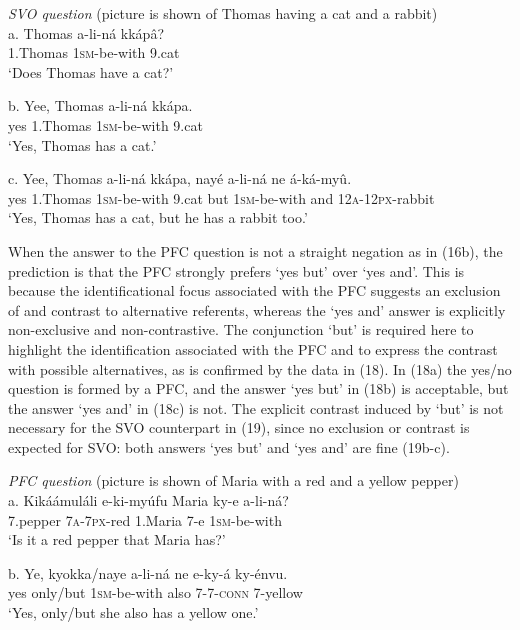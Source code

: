 \documentclass[output=paper]{langsci/langscibook}
\begin{document}
\ea
{\textit{SVO question}}
       (picture is shown of Thomas having a cat and a rabbit)\\
\gll a.  Thomas  a-li-ná  kkápâ?\\
       1.Thomas  \textsc{1sm}{}-be-with  9.cat\\
\glt   ‘Does Thomas have a cat?’
\z

\ea
\gll b.  Yee,   Thomas  a-li-ná  kkápa.\\
       yes  1.Thomas  \textsc{1sm}{}-be-with  9.cat\\
\glt   ‘Yes, Thomas has a cat.’
\z

\ea
\gll   c.   Yee,  Thomas    a-li-ná    kkápa,  nayé  a-li-ná    ne  á-ká-myû.\\
       yes  1.Thomas  \textsc{1sm}{}-be-with  9.cat   but    \textsc{1sm}{}-be-with  and  \textsc{12a}{}-\textsc{12px}{}-rabbit\\
\glt   ‘Yes, Thomas has a cat, but he has a rabbit too.’
\z

When the answer to the PFC question is not a straight negation as in (16b), the prediction is that the PFC strongly prefers ‘yes but’ over ‘yes and’. This is because the identificational focus associated with the PFC suggests an exclusion of and contrast to alternative referents, whereas the ‘yes and’ answer is explicitly non-exclusive and non-contrastive. The conjunction ‘but’ is required here to highlight the identification associated with the PFC and to express the contrast with possible alternatives, as is confirmed by the data in (18). In (18a) the yes/no question is formed by a PFC, and the answer ‘yes but’ in (18b) is acceptable, but the answer ‘yes and’ in (18c) is not. The explicit contrast induced by ‘but’ is not necessary for the SVO counterpart in (19), since no exclusion or contrast is expected for SVO: both answers ‘yes but’ and ‘yes and’ are fine (19b-c).

\ea
{\textit{PFC question}}
     (picture is shown of Maria with a red and a yellow pepper)\\
\gll   a.  Kikáámuláli  e-ki-myúfu  Maria    ky-e  a-li-ná?\\
         7.pepper  \textsc{7a}{}-\textsc{7px}{}-red  1.Maria  7-e  \textsc{1sm}{}-be-with\\
\glt     ‘Is it a red pepper that Maria has?’
\z

\ea
\gll   b.  Ye,  kyokka/naye  a-li-ná  ne  e-ky-á    ky-énvu.\\
         yes  only/but  \textsc{1sm}{}-be-with  also  \textsc{7}{}-\textsc{7}{}-\textsc{conn}  7-yellow\\
\glt     ‘Yes, only/but she also has a yellow one.’
\z
\end{document}
